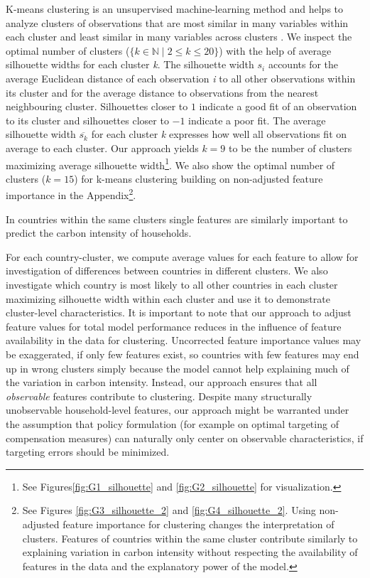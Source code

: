 \documentclass[12pt, a4paper]{article}
\begin{document}
K-means clustering is an unsupervised machine-learning method and helps to analyze clusters of observations that are most similar in many variables within each cluster and least similar in many variables across clusters \autocite{MacQueen.1967}. We inspect the optimal number of clusters ($\{k \in \mathbb{N} \mid 2  \leq k \leq 20 \}$) with the help of average silhouette widths \autocite{Rousseeuw.1987} for each cluster \textit{k}. The silhouette width $s_{i}$ accounts for the average Euclidean distance of each observation \textit{i} to all other observations within its cluster and for the average distance to observations from the nearest neighbouring cluster. Silhouettes closer to $1$ indicate a good fit of an observation to its cluster and silhouettes closer to $-1$ indicate a poor fit. The average silhouette width $\overline{s_{k}}$ for each cluster \textit{k} expresses how well all observations fit on average to each cluster. Our approach yields $k = 9$ to be the number of clusters maximizing average silhouette width\footnote{See Figures\ref{fig:G1_silhouette} and \ref{fig:G2_silhouette} for visualization.}. We also show the optimal number of clusters ($k = 15$) for k-means clustering building on non-adjusted feature importance in the Appendix\footnote{See Figures \ref{fig:G3_silhouette_2} and \ref{fig:G4_silhouette_2}. Using non-adjusted feature importance for clustering changes the interpretation of clusters. Features of countries within the same cluster contribute similarly to explaining variation in carbon intensity without respecting the availability of features in the data and the explanatory power of the model.}.

In countries within the same clusters single features are similarly important to predict the carbon intensity of households. 

For each country-cluster, we compute average values for each feature to allow for investigation of differences between countries in different clusters. We also investigate which country is most likely to all other countries in each cluster maximizing silhouette width within each cluster and use it to demonstrate cluster-level characteristics. 
It is important to note that our approach to adjust feature values for total model performance reduces in the influence of feature availability in the data for clustering. Uncorrected feature importance values may be exaggerated, if only few features exist, so countries with few features may end up in wrong clusters simply because the model cannot help explaining much of the variation in carbon intensity. Instead, our approach ensures that all \textit{observable} features contribute to clustering. Despite many structurally unobservable household-level features, our approach might be warranted under the assumption that policy formulation (for example on optimal targeting of compensation measures) can naturally only center on observable characteristics, if targeting errors should be minimized.
\end{document}
